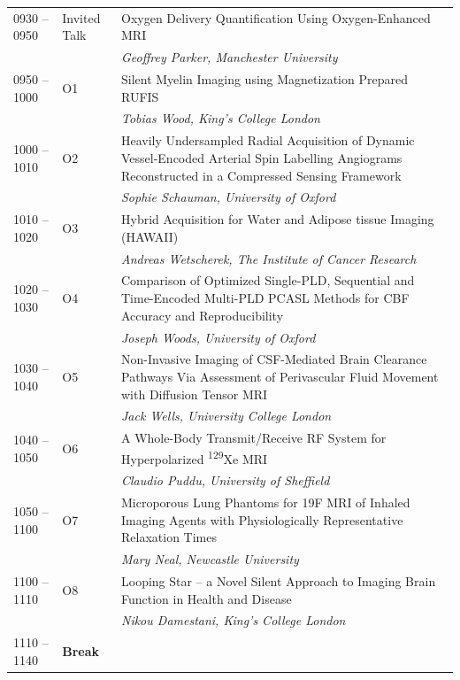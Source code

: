\documentclass[a5paper,10pt,twoside,onecolumn,openany,helvetica,showtrims]{memoir}
\newlength{\JackBoxOne}
\newlength{\JackBoxTwo}
\newlength{\JackBoxThree}
\newcommand{\talkauthor}[1]{\small\emph{#1}}
\begin{document}
\noindent\hspace{-0.75em}\begin{tabular}{p{\JackBoxOne}p{\JackBoxTwo}p{\JackBoxThree}}
0930 -- 0950 & Invited Talk & Oxygen Delivery Quantification Using Oxygen-Enhanced MRI \\ 
			& & \talkauthor{Geoffrey Parker, Manchester University} \\ 
0950 -- 1000 & O1 & Silent Myelin Imaging using Magnetization Prepared RUFIS \\ 
			 &	   & 
			 \talkauthor{Tobias Wood, King's College London} \\ 
1000 -- 1010 & O2 & Heavily Undersampled Radial Acquisition of Dynamic Vessel-Encoded Arterial Spin Labelling Angiograms Reconstructed in a Compressed Sensing Framework\\
			 &    & \talkauthor{Sophie Schauman, University of Oxford} \\ 
1010 -- 1020 & O3 & Hybrid Acquisition for Water and Adipose tissue Imaging (HAWAII)\\
			 & 	  & \talkauthor{Andreas Wetscherek, The Institute of Cancer Research} \\ 
1020 -- 1030 & O4 & Comparison of Optimized Single-PLD, Sequential and Time-Encoded Multi-PLD PCASL Methods for CBF Accuracy and Reproducibility\\
			& 	  & \talkauthor{Joseph Woods, University of Oxford} \\ 
1030 -- 1040 & O5 & Non-Invasive Imaging of CSF-Mediated Brain Clearance Pathways Via Assessment of Perivascular Fluid Movement with Diffusion Tensor MRI \\ 
			& 	&\talkauthor{Jack Wells, University College London} \\ 
1040 -- 1050 & O6 & A Whole-Body Transmit/Receive RF System for Hyperpolarized \textsuperscript{129}Xe MRI \\
			&	& \talkauthor{Claudio Puddu, University of Sheffield} \\ 
1050 -- 1100 & O7 & Microporous Lung Phantoms for 19F MRI of Inhaled Imaging Agents with Physiologically Representative Relaxation Times \\
			&	& \talkauthor{Mary Neal, Newcastle University} \\ 
1100 -- 1110 & O8 & Looping Star -- a Novel Silent Approach to Imaging Brain Function in Health and Disease \\ 
            &   & \talkauthor{Nikou Damestani, King's College London}\\
1110 -- 1140 & \textbf{Break} & 
\end{tabular}
\end{document}
